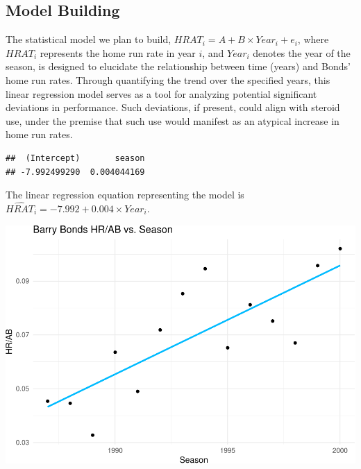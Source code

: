 \documentclass[
]{article}
\newenvironment{Shaded}{\begin{snugshade}}{\end{snugshade}}
\newcommand{\AttributeTok}[1]{\textcolor[rgb]{0.13,0.29,0.53}{#1}}
\newcommand{\FunctionTok}[1]{\textcolor[rgb]{0.13,0.29,0.53}{\textbf{#1}}}
\newcommand{\NormalTok}[1]{#1}
\newcommand{\OtherTok}[1]{\textcolor[rgb]{0.56,0.35,0.01}{#1}}
\newcommand{\SpecialCharTok}[1]{\textcolor[rgb]{0.81,0.36,0.00}{\textbf{#1}}}
\begin{document}
\subsection{Model Building}\label{model-building}

The statistical model we plan to build,
\(HRAT_{i} = A + B \times Year_{i} + e_{i}\), where \(HRAT_{i}\)
represents the home run rate in year \(i\), and \(Year_{i}\) denotes the
year of the season, is designed to elucidate the relationship between
time (years) and Bonds' home run rates. Through quantifying the trend
over the specified years, this linear regression model serves as a tool
for analyzing potential significant deviations in performance. Such
deviations, if present, could align with steroid use, under the premise
that such use would manifest as an atypical increase in home run rates.

\begin{Shaded}
\end{Shaded}

\begin{verbatim}
##  (Intercept)       season 
## -7.992499290  0.004044169
\end{verbatim}

The linear regression equation representing the model is
\(\hat{HRAT_{i}} = -7.992 + 0.004 \times Year_{i}\).

\includegraphics{602_project_files/figure-latex/unnamed-chunk-4-1.pdf}
\end{document}
